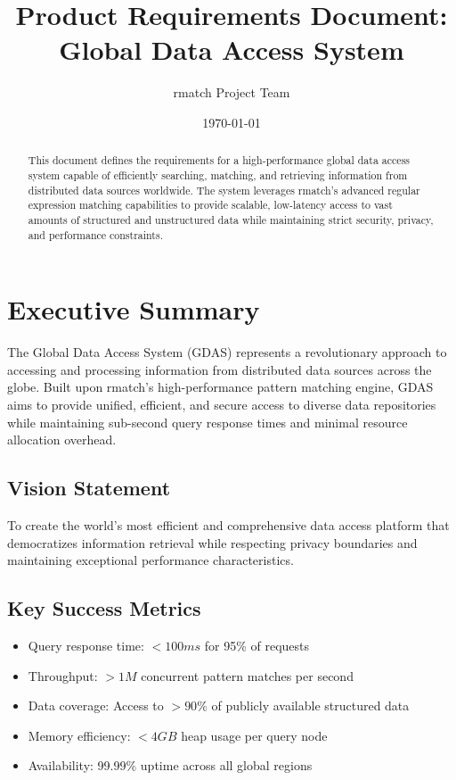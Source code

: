 \documentclass[11pt,a4paper]{article}
\title{\textbf{Product Requirements Document:\\Global Data Access System}}
\author{rmatch Project Team}
\date{\today}
\begin{document}
\maketitle

\begin{abstract}
This document defines the requirements for a high-performance global data access system capable of efficiently searching, matching, and retrieving information from distributed data sources worldwide. The system leverages rmatch's advanced regular expression matching capabilities to provide scalable, low-latency access to vast amounts of structured and unstructured data while maintaining strict security, privacy, and performance constraints.
\end{abstract}

\newpage
\tableofcontents
\newpage

\section{Executive Summary}

The Global Data Access System (GDAS) represents a revolutionary approach to accessing and processing information from distributed data sources across the globe. Built upon rmatch's high-performance pattern matching engine, GDAS aims to provide unified, efficient, and secure access to diverse data repositories while maintaining sub-second query response times and minimal resource allocation overhead.

\subsection{Vision Statement}
To create the world's most efficient and comprehensive data access platform that democratizes information retrieval while respecting privacy boundaries and maintaining exceptional performance characteristics.

\subsection{Key Success Metrics}
\begin{itemize}
\item Query response time: $< 100ms$ for 95\% of requests
\item Throughput: $> 1M$ concurrent pattern matches per second
\item Data coverage: Access to $> 90\%$ of publicly available structured data
\item Memory efficiency: $< 4GB$ heap usage per query node
\item Availability: 99.99\% uptime across all global regions
\end{itemize}
\end{document}
